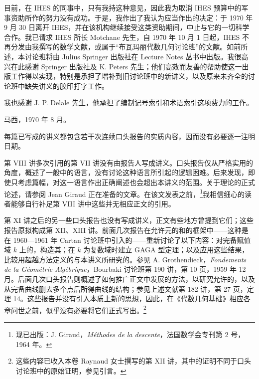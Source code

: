 目前，在 IHES 的同事中，只有我持这种意见，因此我为取消 IHES 预算中的军事资助所作的努力没有成功。于是，我作出了我认为应当作出的决定：于 1970 年 9 月 30 日离开 IHES，并在该机构继续接受这类资助期间，中止与它的一切科学合作。我已请求 IHES 所长 Motchane 先生，自 1970 年 10 月 1 日起，IHES 不再分发由我撰写的数学文献，或属于“布瓦玛丽代数几何讨论班”的文献。如前所述，本讨论班将由 Julius Springer 出版社在 Lecture Notes 丛书中出版。我很高兴在此感谢 Springer 出版社及 K. Peters 先生；他们高效而友善的帮助使这一出版工作得以实现，特别是承担了增补到旧讨论班中的新讲义，以及原来未齐全的讨论班中缺失讲义的胶印打字工作。

我也感谢 J. P. Delale 先生，他承担了编制记号索引和术语索引这项费力的工作。

\begin{flushright}马西，1970 年 8 月。\end{flushright}

每篇已写成的讲义都包含若干次连续口头报告的实质内容，因而没有必要逐一注明日期。

第 VIII 讲多次引用的第 VII 讲没有由报告人写成讲义。口头报告仅从严格实用的角度，概述了一般中的语言，没有讨论这种语言所引起的逻辑困难。后来发现，即使只考虑篇幅，对这一语言作出正确阐述也会超出本讲义的范围。关于理论的正式论述，请参阅 Jean Giraud 正在准备的文章。在该文发表之前，\footnote{现已出版：J. Giraud，\textit{Méthodes de la descente}，法国数学会专刊第 2 号，1964 年。}我相信细心的读者能够自行补足第 VIII 讲中这些并无相应正文的引用。

第 XI 讲之后的另一些口头报告也没有写成讲义，正文有些地方曾提到它们；这些报告原拟构成第 XII、XIII 讲。前面几次报告在允许元的和的框架中——这种是在 1960—1961 年 Cartan 讨论班中引入的——重新讨论了以下内容：对完备赋值域 $k$ 上的，构造其；在 $k$ 为复数域时建立 GAGA 型定理；以及应用这些结果，比较用超越方法定义的与本讲义所研究的。参见 A. Grothendieck，\textit{Fondements de la Géométrie Algébrique}，Bourbaki 讨论班第 190 讲，第 10 页，1959 年 12 月。后面几次口头报告则概述了如何推广正文中发展的方法，以研究允许的，以及从完备曲线删去多个点后所得曲线的结构；参见上述文献第 182 讲，第 27 页，定理 14。这些报告并没有引入本质上新的思想，因此，在《代数几何基础》相应各章问世之前，似乎没有必要将它们正式写出。\footnote{这些内容已收入本卷 Raynaud 女士撰写的第 XII 讲，其中的证明不同于口头讨论班中的原始证明，参见引言。}

